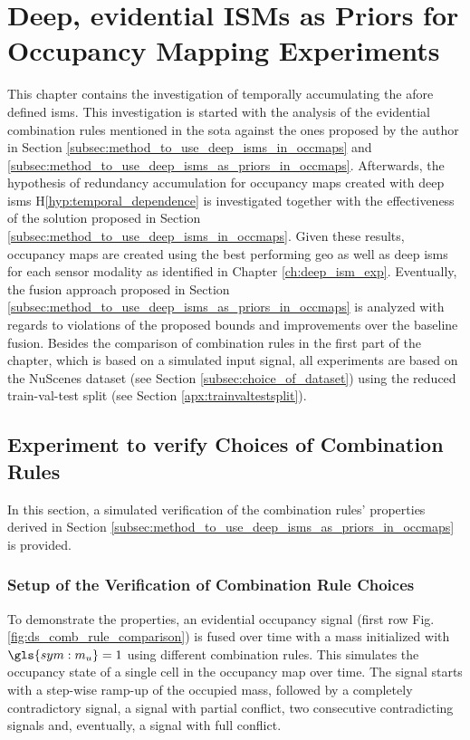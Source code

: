 \chapter{Deep, evidential ISMs as Priors for Occupancy Mapping Experiments}
\label{ch:deep_ev_isms_as_prior_for_occmaps_exp}
This chapter contains the investigation of temporally accumulating the afore defined \gls{ism}s. This investigation is started with the analysis of the evidential combination rules mentioned in the \gls{sota} against the ones proposed by the author in Section \ref{subsec:method_to_use_deep_isms_in_occmaps} and \ref{subsec:method_to_use_deep_isms_as_priors_in_occmaps}. Afterwards, the hypothesis of redundancy accumulation for occupancy maps created with deep \gls{ism}s H\ref{hyp:temporal_dependence} is investigated together with the effectiveness of the solution proposed in Section \ref{subsec:method_to_use_deep_isms_in_occmaps}. Given these results, occupancy maps are created using the best performing geo as well as deep \gls{ism}s for each sensor modality as identified in Chapter \ref{ch:deep_ism_exp}. Eventually, the fusion approach proposed in Section \ref{subsec:method_to_use_deep_isms_as_priors_in_occmaps} is analyzed with regards to violations of the proposed bounds and improvements over the baseline fusion. Besides the comparison of combination rules in the first part of the chapter, which is based on a simulated input signal, all experiments are based on the NuScenes dataset (see Section \ref{subsec:choice_of_dataset}) using the reduced train-val-test split (see Section \ref{apx:trainvaltestsplit}).
%
\section{Experiment to verify Choices of Combination Rules}
\label{sec:exp_choice_comb_rule}
In this section, a simulated verification of the combination rules' properties derived in Section \ref{subsec:method_to_use_deep_isms_as_priors_in_occmaps} is provided.
%
\subsection{Setup of the Verification of Combination Rule Choices}
\label{subsec:setup_choice_comb_rule}
To demonstrate the properties, an evidential occupancy signal (first row Fig. \ref{fig:ds_comb_rule_comparison}) is fused over time with a mass initialized with $\gls{sym:m_u} = 1$ using different combination rules. This simulates the occupancy state of a single cell in the occupancy map over time. The signal starts with a step-wise ramp-up of the occupied mass, followed by a completely contradictory signal, a signal with partial conflict, two consecutive contradicting signals and, eventually, a signal with full conflict.
%
